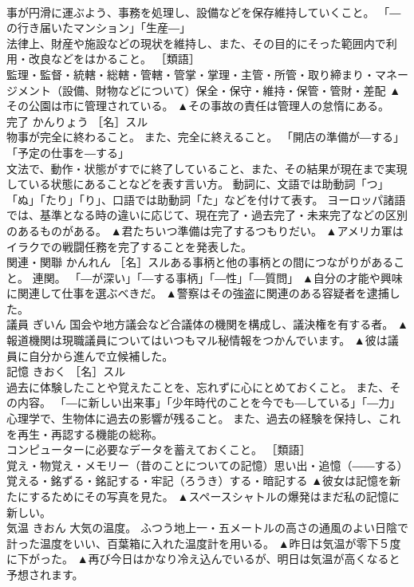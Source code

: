 \documentclass[8pt]{extreport}
\begin{document}
\begin{CJK}{UTF8}{min}
\\	事が円滑に運ぶよう、事務を処理し、設備などを保存維持していくこと。 「―の行き届いたマンション」「生産―」 
\\	法律上、財産や施設などの現状を維持し、また、その目的にそった範囲内で利用・改良などをはかること。 ［類語］
\\	監理・監督・統轄・総轄・管轄・管掌・掌理・主管・所管・取り締まり・マネージメント（設備、財物などについて）保全・保守・維持・保管・管財・差配	▲その公園は市に管理されている。 ▲その事故の責任は管理人の怠惰にある。
\\	完了	かんりょう	［名］スル 
\\	物事が完全に終わること。 また、完全に終えること。 「開店の準備が―する」「予定の仕事を―する」 
\\	文法で、動作・状態がすでに終了していること、また、その結果が現在まで実現している状態にあることなどを表す言い方。 動詞に、文語では助動詞「つ」「ぬ」「たり」「り」、口語では助動詞「た」などを付けて表す。 ヨーロッパ諸語では、基準となる時の違いに応じて、現在完了・過去完了・未来完了などの区別のあるものがある。	▲君たちいつ準備は完了するつもりだい。 ▲アメリカ軍はイラクでの戦闘任務を完了することを発表した。
\\	関連・関聯	かんれん	［名］スルある事柄と他の事柄との間につながりがあること。 連関。 「―が深い」「―する事柄」「―性」「―質問」	▲自分の才能や興味に関連して仕事を選ぶべきだ。 ▲警察はその強盗に関連のある容疑者を逮捕した。
\\	議員	ぎいん	国会や地方議会など合議体の機関を構成し、議決権を有する者。	▲報道機関は現職議員についてはいつもマル秘情報をつかんでいます。 ▲彼は議員に自分から進んで立候補した。
\\	記憶	きおく	［名］スル 
\\	過去に体験したことや覚えたことを、忘れずに心にとめておくこと。 また、その内容。 「―に新しい出来事」「少年時代のことを今でも―している」「―力」 
\\	心理学で、生物体に過去の影響が残ること。 また、過去の経験を保持し、これを再生・再認する機能の総称。 
\\	コンピューターに必要なデータを蓄えておくこと。 ［類語］
\\	覚え・物覚え・メモリー（昔のことについての記憶）思い出・追憶（――する）覚える・銘ずる・銘記する・牢記（ろうき）する・暗記する	▲彼女は記憶を新たにするためにその写真を見た。 ▲スペースシャトルの爆発はまだ私の記憶に新しい。
\\	気温	きおん	大気の温度。 ふつう地上一・五メートルの高さの通風のよい日陰で計った温度をいい、百葉箱に入れた温度計を用いる。	▲昨日は気温が零下５度に下がった。 ▲再び今日はかなり冷え込んでいるが、明日は気温が高くなると予想されます。

\end{CJK}
\end{document}
